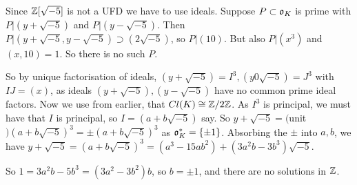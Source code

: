 \documentclass[10pt,a4paper]{article}
\begin{document}
Since $\mathbb{Z}[\sqrt{-5}]$ is not a UFD we have to use ideals. Suppose $P \subset \mathfrak{o}_K$ is prime with $P |(y+\sqrt{-5})$ and $P|(y-\sqrt{-5})$. Then $P | (y+\sqrt{-5}, y-\sqrt{-5}) \supset (2\sqrt{-5})$, so $P |(10)$. But also $P|(x^3)$ and $(x,10) = 1$. So there is no such $P$.

So by unique factorisation of ideals, $(y+\sqrt{-5}) = I^3, (y0\sqrt{-5}) = J^3$ with $IJ = (x)$, as ideals $(y+\sqrt{-5}), (y-\sqrt{-5})$ have no common prime ideal factors. Now we use from earlier, that $Cl(K) \cong \mathbb{Z}/2\mathbb{Z}$. As $I^3$ is principal, we must have that $I$ is principal, so $I = (a+b\sqrt{-5})$ say. So $y+\sqrt{-5} = ($unit$)(a+b\sqrt{-5})^3 = \pm(a+b\sqrt{-5})^3$ as $\mathfrak{o}_K^\ast = \{\pm 1\}$. Absorbing the $\pm$ into $a,b$, we have $y+\sqrt{-5} = (a+b\sqrt{-5})^3 = (a^3 - 15ab^2) + (3a^2b-3b^3)\sqrt{-5}$.

So $1 = 3a^2b - 5b^3 = (3a^2-3b^2)b$, so $b = \pm 1$, and there are no solutions in $\mathbb{Z}$.
\end{document}
